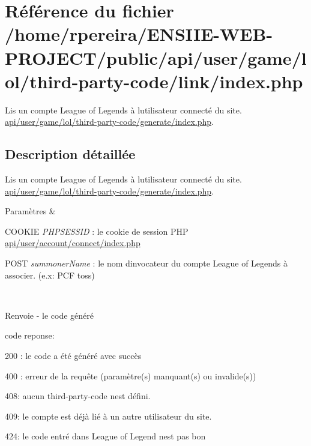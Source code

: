\hypertarget{user_2game_2lol_2third-party-code_2link_2index_8php}{}\section{Référence du fichier /home/rpereira/\+E\+N\+S\+I\+I\+E-\/\+W\+E\+B-\/\+P\+R\+O\+J\+E\+C\+T/public/api/user/game/lol/third-\/party-\/code/link/index.php}
\label{user_2game_2lol_2third-party-code_2link_2index_8php}


Lis un compte League of Legends à l\textquotesingle{}utilisateur connecté du site. \hyperlink{user_2game_2lol_2third-party-code_2generate_2index_8php}{api/user/game/lol/third-\/party-\/code/generate/index.\+php}.  




\subsection{Description détaillée}
Lis un compte League of Legends à l\textquotesingle{}utilisateur connecté du site. \hyperlink{user_2game_2lol_2third-party-code_2generate_2index_8php}{api/user/game/lol/third-\/party-\/code/generate/index.\+php}. 


\begin{DoxyParams}{Paramètres}
{\em } & 
\begin{DoxyItemize}
\item C\+O\+O\+K\+IE {\itshape P\+H\+P\+S\+E\+S\+S\+ID} \+: le cookie de session P\+HP \hyperlink{user_2account_2connect_2index_8php}{api/user/account/connect/index.\+php}
\item P\+O\+ST {\itshape summoner\+Name} \+: le nom d\textquotesingle{}invocateur du compte League of Legends à associer. (e.\+x\+: \textquotesingle{}P\+CF toss\textquotesingle{}) 
\end{DoxyItemize}\\
\hline
\end{DoxyParams}
\begin{DoxyReturn}{Renvoie}
-\/ le code généré
\begin{DoxyItemize}
\item code reponse\+:
\item 200 \+: le code a été généré avec succès
\item 400 \+: erreur de la requête (paramètre(s) manquant(s) ou invalide(s))
\item 408\+: aucun third-\/party-\/code n\textquotesingle{}est défini.
\item 409\+: le compte est déjà lié à un autre utilisateur du site.
\item 424\+: le code entré dans League of Legend n\textquotesingle{}est pas bon 
\end{DoxyItemize}
\end{DoxyReturn}
